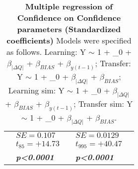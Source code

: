 \begin{table}
\begin{tabular}{r|llll}
&$SE=0.107$&&$SE=0.0129$&\\
&$t_{85}=+14.73$&&$t_{995}=+40.47$&\\
&\textbf{\textit{p\textless0.0001}}&&\textbf{\textit{p\textless0.0001}}&\\
\hline \hline
\end{tabular}
\caption{\textbf{Multiple regression of Confidence on Confidence parameters (Standardized coefficients)} Models were specified as follows. Learning: Y $\sim$ 1 + \beta_0 + $\beta_{|\Delta Q|}$ + $\beta_{BIAS}$ + $\beta_{y(t-1)}$; Transfer: Y $\sim$ 1 + \beta_0 + $\beta_{|\Delta Q|}$ + $\beta_{BIAS}$; Learning sim: Y $\sim$ 1 + \beta_0 + $\beta_{|\Delta Q|}$ + $\beta_{BIAS}$ + $\beta_{y(t-1)}$; Transfer sim: Y $\sim$ 1 + \beta_0 + $\beta_{|\Delta Q|}$ + $\beta_{BIAS}$.}
\label{tab:Multiple regressionConfidence}
\end{table}
% 
% 
